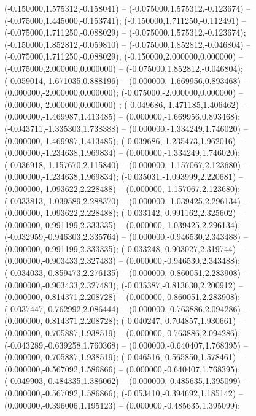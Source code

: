  (-0.150000,1.575312,-0.158041) -- (-0.075000,1.575312,-0.123674) -- (-0.075000,1.445000,-0.153741);
 (-0.150000,1.711250,-0.112491) -- (-0.075000,1.711250,-0.088029) -- (-0.075000,1.575312,-0.123674);
 (-0.150000,1.852812,-0.059810) -- (-0.075000,1.852812,-0.046804) -- (-0.075000,1.711250,-0.088029);
 (-0.150000,2.000000,0.000000) -- (-0.075000,2.000000,0.000000) -- (-0.075000,1.852812,-0.046804);
 (-0.059014,-1.671035,0.888196) -- (0.000000,-1.669956,0.893468) -- (0.000000,-2.000000,0.000000);
 (-0.075000,-2.000000,0.000000) -- (0.000000,-2.000000,0.000000) ;
 (-0.049686,-1.471185,1.406462) -- (0.000000,-1.469987,1.413485) -- (0.000000,-1.669956,0.893468);
 (-0.043711,-1.335303,1.738388) -- (0.000000,-1.334249,1.746020) -- (0.000000,-1.469987,1.413485);
 (-0.039686,-1.235473,1.962016) -- (0.000000,-1.234638,1.969834) -- (0.000000,-1.334249,1.746020);
 (-0.036918,-1.157670,2.115840) -- (0.000000,-1.157067,2.123680) -- (0.000000,-1.234638,1.969834);
 (-0.035031,-1.093999,2.220681) -- (0.000000,-1.093622,2.228488) -- (0.000000,-1.157067,2.123680);
 (-0.033813,-1.039589,2.288370) -- (0.000000,-1.039425,2.296134) -- (0.000000,-1.093622,2.228488);
 (-0.033142,-0.991162,2.325602) -- (0.000000,-0.991199,2.333335) -- (0.000000,-1.039425,2.296134);
 (-0.032959,-0.946303,2.335764) -- (0.000000,-0.946530,2.343488) -- (0.000000,-0.991199,2.333335);
 (-0.033248,-0.903027,2.319744) -- (0.000000,-0.903433,2.327483) -- (0.000000,-0.946530,2.343488);
 (-0.034033,-0.859473,2.276135) -- (0.000000,-0.860051,2.283908) -- (0.000000,-0.903433,2.327483);
 (-0.035387,-0.813630,2.200912) -- (0.000000,-0.814371,2.208728) -- (0.000000,-0.860051,2.283908);
 (-0.037447,-0.762992,2.086444) -- (0.000000,-0.763886,2.094286) -- (0.000000,-0.814371,2.208728);
 (-0.040247,-0.704857,1.930661) -- (0.000000,-0.705887,1.938519) -- (0.000000,-0.763886,2.094286);
 (-0.043289,-0.639258,1.760368) -- (0.000000,-0.640407,1.768395) -- (0.000000,-0.705887,1.938519);
 (-0.046516,-0.565850,1.578461) -- (0.000000,-0.567092,1.586866) -- (0.000000,-0.640407,1.768395);
 (-0.049903,-0.484335,1.386062) -- (0.000000,-0.485635,1.395099) -- (0.000000,-0.567092,1.586866);
 (-0.053410,-0.394692,1.185142) -- (0.000000,-0.396006,1.195123) -- (0.000000,-0.485635,1.395099);
